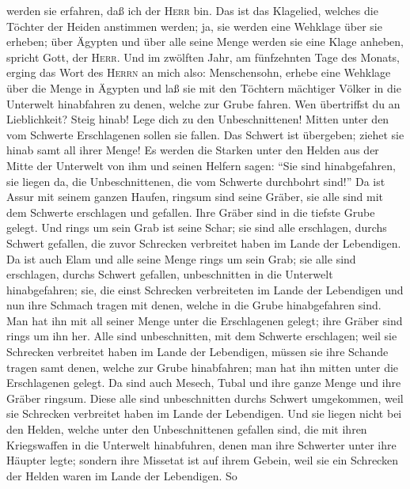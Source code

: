 werden sie erfahren, daß ich der \textsc{Herr} bin.  Das
ist das Klagelied, welches die Töchter der Heiden anstimmen werden; ja,
sie werden eine Wehklage über sie erheben; über Ägypten und über alle
seine Menge werden sie eine Klage anheben, spricht Gott, der
\textsc{Herr}.  Und im zwölften Jahr, am fünfzehnten Tage
des Monats, erging das Wort des \textsc{Herrn} an mich also:
 Menschensohn, erhebe eine Wehklage über die Menge in
Ägypten und laß sie mit den Töchtern mächtiger Völker in die Unterwelt
hinabfahren zu denen, welche zur Grube fahren.  Wen
übertriffst du an Lieblichkeit? Steig hinab! Lege dich zu den
Unbeschnittenen!  Mitten unter den vom Schwerte
Erschlagenen sollen sie fallen. Das Schwert ist übergeben; ziehet sie
hinab samt all ihrer Menge!  Es werden die Starken unter
den Helden aus der Mitte der Unterwelt von ihm und seinen Helfern sagen:
``Sie sind hinabgefahren, sie liegen da, die Unbeschnittenen, die vom
Schwerte durchbohrt sind!''  Da ist Assur mit seinem
ganzen Haufen, ringsum sind seine Gräber, sie alle sind mit dem Schwerte
erschlagen und gefallen.  Ihre Gräber sind in die tiefste
Grube gelegt. Und rings um sein Grab ist seine Schar; sie sind alle
erschlagen, durchs Schwert gefallen, die zuvor Schrecken verbreitet
haben im Lande der Lebendigen.  Da ist auch Elam und alle
seine Menge rings um sein Grab; sie alle sind erschlagen, durchs Schwert
gefallen, unbeschnitten in die Unterwelt hinabgefahren; sie, die einst
Schrecken verbreiteten im Lande der Lebendigen und nun ihre Schmach
tragen mit denen, welche in die Grube hinabgefahren sind.
 Man hat ihn mit all seiner Menge unter die Erschlagenen
gelegt; ihre Gräber sind rings um ihn her. Alle sind unbeschnitten, mit
dem Schwerte erschlagen; weil sie Schrecken verbreitet haben im Lande
der Lebendigen, müssen sie ihre Schande tragen samt denen, welche zur
Grube hinabfahren; man hat ihn mitten unter die Erschlagenen gelegt.
 Da sind auch Mesech, Tubal und ihre ganze Menge und ihre
Gräber ringsum. Diese alle sind unbeschnitten durchs Schwert umgekommen,
weil sie Schrecken verbreitet haben im Lande der Lebendigen.
 Und sie liegen nicht bei den Helden, welche unter den
Unbeschnittenen gefallen sind, die mit ihren Kriegswaffen in die
Unterwelt hinabfuhren, denen man ihre Schwerter unter ihre Häupter
legte; sondern ihre Missetat ist auf ihrem Gebein, weil sie ein
Schrecken der Helden waren im Lande der Lebendigen.  So
